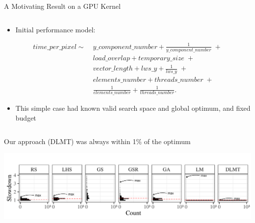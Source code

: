 \documentclass[11pt, compress, aspectratio=169, xcolor={table,usenames,dvipsnames}]{beamer}
\begin{document}
\begin{frame}
\begin{columns}
\begin{column}{0.89\columnwidth}
\begin{columns}
\begin{column}[t]{0.48\columnwidth}
\begin{block}{A Motivating Result on a GPU Kernel}
\begin{columns}
\begin{column}{0.49\columnwidth}
\begin{itemize}
\item Initial \alert{performance model}:
\end{itemize}
{\tiny
  \begin{align}
    time\_per\_pixel \sim & \; y\_component\_number + \frac{1}{y\_component\_number} \; + \nonumber \\
    & \; load\_overlap + temporary\_size \; + \nonumber \\
    & \; vector\_length + lws\_y + \frac{1}{lws\_y} \; + \nonumber \\
    & \; elements\_number + threads\_number  \; + \nonumber \\
    & \; \frac{1}{elements\_number} + \frac{1}{threads\_number}\text{.} \nonumber
  \end{align}
}

\begin{itemize}
\item This \alert{simple case} had known \alert{valid search space} and
\alert{global optimum}, and \alert{fixed budget}
\end{itemize}
\end{column}
\end{columns}
\vspace{1em}
\begin{center}
{\small
Our approach (\alert{DLMT}) was always \alert{within 1\% of the optimum}
}
\end{center}
\begin{center}
\includegraphics[width=0.9\columnwidth]{../../../img/comparison_histogram.pdf}
\end{center}


\end{block}
\end{column}
\end{columns}
\end{column}
\end{columns}
\end{frame}
\end{document}
